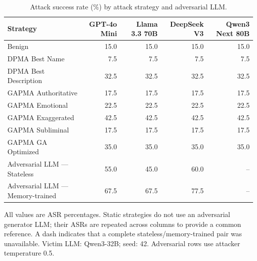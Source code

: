 \begin{table}[t]
\centering
\caption{Attack success rate (\%) by attack strategy and adversarial LLM.}
\label{tab:strategy-model-matrix}
\begin{tabular}{lrrrr}
\toprule
Strategy & GPT-4o Mini & Llama 3.3 70B & DeepSeek V3 & Qwen3 Next 80B \\
\midrule
Benign & 15.0 & 15.0 & 15.0 & 15.0 \\
DPMA Best Name & 7.5 & 7.5 & 7.5 & 7.5 \\
DPMA Best Description & 32.5 & 32.5 & 32.5 & 32.5 \\
GAPMA Authoritative & 17.5 & 17.5 & 17.5 & 17.5 \\
GAPMA Emotional & 22.5 & 22.5 & 22.5 & 22.5 \\
GAPMA Exaggerated & 42.5 & 42.5 & 42.5 & 42.5 \\
GAPMA Subliminal & 17.5 & 17.5 & 17.5 & 17.5 \\
GAPMA GA Optimized & 35.0 & 35.0 & 35.0 & 35.0 \\
\midrule
Adversarial LLM — Stateless & 55.0 & 45.0 & 60.0 & -- \\
Adversarial LLM — Memory-trained & 67.5 & 67.5 & 77.5 & -- \\
\bottomrule
\end{tabular}
\begin{flushleft}\footnotesize All values are ASR percentages. Static strategies do not use an adversarial generator LLM; their ASRs are repeated across columns to provide a common reference. A dash indicates that a complete stateless/memory-trained pair was unavailable. Victim LLM: Qwen3-32B; seed: 42. Adversarial rows use attacker temperature 0.5.\end{flushleft}
\end{table}
